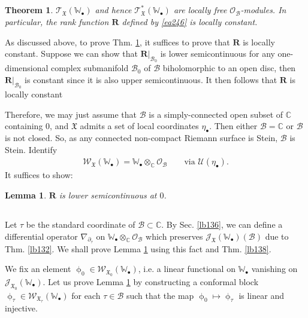 \documentclass[12pt,a4paper,notitlepage]{article}
\theoremstyle{definition}
\theoremstyle{plain}
\newtheorem{thm}[df]{Theorem}
\newtheorem{lm}[df]{Lemma}
\newcommand{\fk}{\mathfrak}
\newcommand{\mc}{\mathcal}
\newcommand{\scr}{\mathscr}
\newcommand{\blt}{\bullet}
\newcommand{\Wbb}{\mathbb W}
\newcommand{\Cbb}{\mathbb C}
\newcommand{\Rbf}{\mathbf R}
\numberwithin{equation}{section}
\begin{document}
\subsection{}

\begin{thm}\label{lb135}
$\scr T_{\fk X}(\Wbb_\blt)$ and hence $\scr T_{\fk X}^*(\Wbb_\blt)$ are locally free $\scr O_{\mc B}$-modules. In particular, the rank function $\Rbf$ defined by \eqref{eq246} is locally constant.
\end{thm}

As discussed above, to prove Thm. \ref{lb135}, it suffices to prove that $\Rbf$ is locally constant. Suppose we can show that $\Rbf|_{\mc B_0}$ is lower semicontinuous for any one-dimensional complex submanifold $\mc B_0$ of $\mc B$ biholomorphic to an open disc, then $\Rbf|_{\mc B_0}$ is constant since it is also upper semicontinuous. It then follows that $\Rbf$ is locally constant

Therefore, we may just assume that $\mc B$ is a simply-connected open subset of $\Cbb$ containing $0$, and $\fk X$ admits a set of local coordinates $\eta_\blt$. Then either $\mc B=\Cbb$ or $\mc B$ is not closed. So, as any connected non-compact Riemann surface is Stein, $\mc B$ is Stein.  Identify
\begin{align*}
\scr W_{\fk X}(\Wbb_\blt)=\Wbb_\blt\otimes_\Cbb\scr O_{\mc B}\qquad\text{via }\mc U(\eta_\blt).
\end{align*}
It suffices to show: 

\begin{lm}\label{lb137}
$\Rbf$ is lower semicontinuous at $0$.
\end{lm}
 






\subsection{}


Let $\tau$ be the standard coordinate of $\mc B\subset\Cbb$. By Sec. \ref{lb136}, we can define a differential operator $\nabla_{\partial_\tau}$ on $\Wbb_\blt\otimes_\Cbb\scr O_{\mc B}$ which preserves $\scr J_{\fk X}(\Wbb_\blt)(\mc B)$ due to Thm. \ref{lb132}. We shall prove Lemma \ref{lb137} using this fact and Thm. \ref{lb138}.

We fix an element $\upphi_0\in\scr W_{\fk X_0}(\Wbb_\blt)$, i.e.  a linear functional on $\Wbb_\blt$ vanishing on $\scr J_{\fk X_0}(\Wbb_\blt)$. Let us prove Lemma \ref{lb137} by constructing a conformal block $\upphi_\tau\in\scr W_{\fk X_\tau}(\Wbb_\blt)$  for each $\tau\in\mc B$ such that  the map $\upphi_0\mapsto \upphi_\tau$ is linear and injective.
\end{document}
